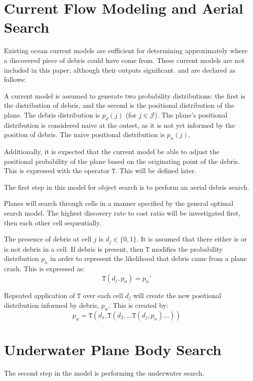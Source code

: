 \documentclass[a4paper]{article}
\begin{document}


\section{Current Flow Modeling and Aerial Search}

Existing ocean current models are sufficient for determining approximately where a discovered piece of debris could have come from. These current models are not included in this paper, although their outputs significant. and are declared as follows:

A current model is assumed to generate two probability distributions: the first is the distribution of debris, and the second is the positional distribution of the plane. The debris distribution is $p_d(j)$ (for $j\in\mathcal{J}$). The plane's positional distribution is considered naive at the outset, as it is not yet informed by the position of debris. The naive positional distribution is $p_n(j)$. 

Additionally, it is expected that the current model be able to adjust the positional probability of the plane based on the originating point of the debris. This is expressed with the operator $\mathtt{T}$. This will be defined later. 

The first step in this model for object search is to perform an aerial debris search. 

Planes will search through cells in a manner specified by the general optimal search model. The highest discovery rate to cost ratio will be investigated first, then each other cell sequentially.

The presence of debris at cell $j$ is $d_j\in \{0,1\}$. It is assumed that there either is or is not debris in a cell. If debris is present, then $\mathtt{T}$ modifies the probability distribution $p_n$ in order to represent the likelihood that debris came from a plane crash. This is expressed as: $$\mathtt{T}(d_j,p_n)=p_n'$$

Repeated application of $\mathtt{T}$ over each cell $d_j$ will create the new positional distribution informed by debris, $p_w$. This is created by: $$p_w=\mathtt{T}(d_1, \mathtt{T}(d_2, \ldots \mathtt{T}(d_j, p_n)\ldots))$$

\section{Underwater Plane Body Search}
The second step in the model is performing the underwater search. 
\end{document}
